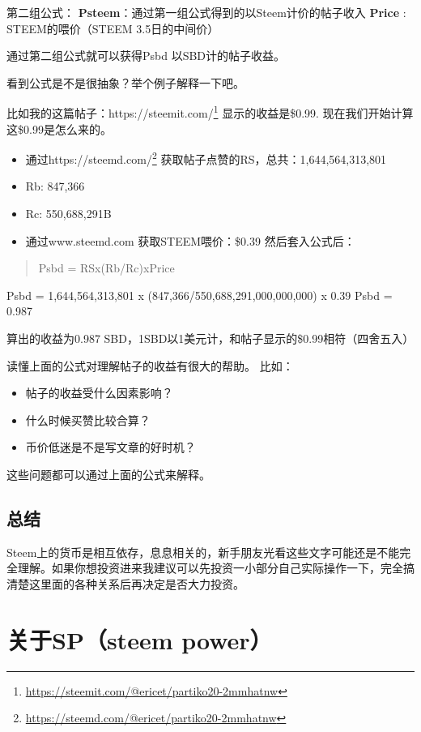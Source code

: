 \documentclass[]{ctexbook}
\providecommand{\tightlist}{%
  \setlength{\itemsep}{0pt}\setlength{\parskip}{0pt}}
\renewcommand{\href}[2]{#2\footnote{\url{#1}}}
\begin{document}
第二组公式：
\textbf{Psteem}：通过第一组公式得到的以Steem计价的帖子收入
\textbf{Price} : STEEM的喂价（STEEM 3.5日的中间价）

通过第二组公式就可以获得Psbd 以SBD计的帖子收益。

看到公式是不是很抽象？举个例子解释一下吧。

比如我的这篇帖子：\href{https://steemit.com/@ericet/partiko20-2mmhatnw}{https://steemit.com/\citet{ericet/partiko20-2mmhatnw}}
显示的收益是\$0.99.
现在我们开始计算这\$0.99是怎么来的。

\begin{itemize}
\tightlist
\item
  通过\href{https://steemd.com/@ericet/partiko20-2mmhatnw}{https://steemd.com/\citet{ericet/partiko20-2mmhatnw}} 获取帖子点赞的RS，总共：1,644,564,313,801
\item
  Rb: 847,366
\item
  Rc: 550,688,291B
\item
  通过www.steemd.com 获取STEEM喂价：\$0.39 然后套入公式后：
\end{itemize}

\begin{quote}
Psbd = RSx(Rb/Rc)xPrice
\end{quote}

Psbd = 1,644,564,313,801 x (847,366/550,688,291,000,000,000) x 0.39
Psbd = 0.987

算出的收益为0.987 SBD，1SBD以1美元计，和帖子显示的\$0.99相符（四舍五入）

读懂上面的公式对理解帖子的收益有很大的帮助。
比如：

\begin{itemize}
\tightlist
\item
  帖子的收益受什么因素影响？
\item
  什么时候买赞比较合算？
\item
  币价低迷是不是写文章的好时机？
\end{itemize}

这些问题都可以通过上面的公式来解释。

\subsection{总结}

Steem上的货币是相互依存，息息相关的，新手朋友光看这些文字可能还是不能完全理解。如果你想投资进来我建议可以先投资一小部分自己实际操作一下，完全搞清楚这里面的各种关系后再决定是否大力投资。

\hypertarget{about-sp}{%
\section{关于SP（steem power）}\label{about-sp}}
\end{document}
